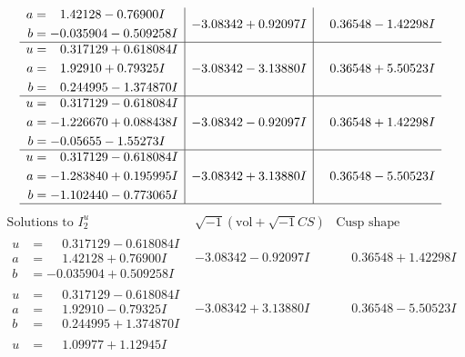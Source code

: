 \documentclass[1p]{elsarticle_modified}
\theoremstyle{definition}
\newcommand{\I}{\sqrt{-1}}
\begin{document}
$$\begin{array}{c|c|c}
\begin{aligned}
a &= \phantom{-}1.42128 - 0.76900 I \\
b &= -0.035904 - 0.509258 I\end{aligned}
 & -3.08342 + 0.92097 I & \phantom{-}0.36548 - 1.42298 I \\ \hline\begin{aligned}
u &= \phantom{-}0.317129 + 0.618084 I \\
a &= \phantom{-}1.92910 + 0.79325 I \\
b &= \phantom{-}0.244995 - 1.374870 I\end{aligned}
 & -3.08342 - 3.13880 I & \phantom{-}0.36548 + 5.50523 I \\ \hline\begin{aligned}
u &= \phantom{-}0.317129 - 0.618084 I \\
a &= -1.226670 + 0.088438 I \\
b &= -0.05655 - 1.55273 I\end{aligned}
 & -3.08342 - 0.92097 I & \phantom{-}0.36548 + 1.42298 I \\ \hline\begin{aligned}
u &= \phantom{-}0.317129 - 0.618084 I \\
a &= -1.283840 + 0.195995 I \\
b &= -1.102440 - 0.773065 I\end{aligned}
 & -3.08342 + 3.13880 I & \phantom{-}0.36548 - 5.50523 I\\
 \hline 
 \end{array}$$\newpage$$\begin{array}{c|c|c}  
\text{Solutions to }I^u_{2}& \I (\text{vol} + \sqrt{-1}CS) & \text{Cusp shape}\\
 \hline 
\begin{aligned}
u &= \phantom{-}0.317129 - 0.618084 I \\
a &= \phantom{-}1.42128 + 0.76900 I \\
b &= -0.035904 + 0.509258 I\end{aligned}
 & -3.08342 - 0.92097 I & \phantom{-}0.36548 + 1.42298 I \\ \hline\begin{aligned}
u &= \phantom{-}0.317129 - 0.618084 I \\
a &= \phantom{-}1.92910 - 0.79325 I \\
b &= \phantom{-}0.244995 + 1.374870 I\end{aligned}
 & -3.08342 + 3.13880 I & \phantom{-}0.36548 - 5.50523 I \\ \hline\begin{aligned}
u &= \phantom{-}1.09977 + 1.12945 I \\

\end{aligned}
\end{array}$$
\end{document}
